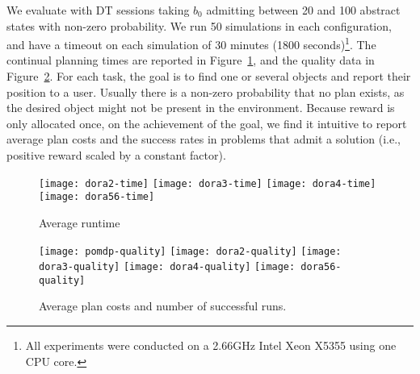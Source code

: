 We evaluate with DT sessions taking $b_0$ admitting between 20 and 100
abstract states with non-zero probability. We run 50 simulations in
each configuration, and have a timeout on each simulation of 30
minutes (1800 seconds)\footnote{All experiments were conducted on a
 2.66GHz Intel Xeon X5355 using one CPU core.}. The continual planning
times are reported in Figure~\ref{fig:results-time}, and the quality
data in Figure~\ref{fig:results-quality}.
For each task, the goal is to find one or several objects and report
their position to a user. Usually there is a non-zero probability that
no plan exists, as the desired object might not be present in the
environment.
Because reward is only allocated
once, on the achievement of the goal,  we find it
intuitive to report average plan costs and the success rates in
problems that admit a solution (i.e., positive reward scaled by a
constant factor).

\begin{figure}[h!]
  \texttt{[image: dora2-time]}\hfill
  \texttt{[image: dora3-time]}\hfill
  \texttt{[image: dora4-time]}\hfill
  \vspace{2mm}
  \texttt{[image: dora56-time]}\hfill
  \caption{Average runtime}
  \label{fig:results-time}
\end{figure}

\begin{figure}[h!]
  \texttt{[image: pomdp-quality]}\hfill
  \texttt{[image: dora2-quality]}\hfill
  \texttt{[image: dora3-quality]}\hfill
  \texttt{[image: dora4-quality]}\hfill
  \vspace{2mm}
  \texttt{[image: dora56-quality]}\hfill
  \caption{Average plan costs and number of successful runs.}
  \label{fig:results-quality}
\end{figure}


